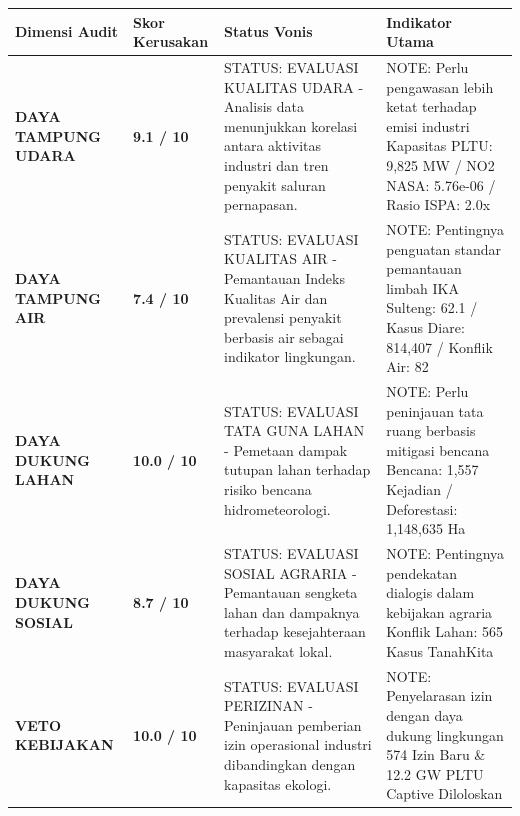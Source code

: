 \documentclass[
]{article}
\newcounter{none} %
\begin{document}
{\def\LTcaptype{none} %
\begin{longtable}[]{@{}
  >{\raggedright\arraybackslash}p{}
  >{\raggedright\arraybackslash}p{}
  >{\raggedright\arraybackslash}p{}
  >{\raggedright\arraybackslash}p{}@{}}
\toprule\noalign{}
\begin{minipage}[b]{\linewidth}\raggedright
Dimensi Audit
\end{minipage} & \begin{minipage}[b]{\linewidth}\raggedright
Skor Kerusakan
\end{minipage} & \begin{minipage}[b]{\linewidth}\raggedright
Status Vonis
\end{minipage} & \begin{minipage}[b]{\linewidth}\raggedright
Indikator Utama
\end{minipage} \\
\midrule\noalign{}
\endhead
\bottomrule\noalign{}
\endlastfoot
\textbf{DAYA TAMPUNG UDARA} & \textbf{9.1 / 10} & STATUS: EVALUASI
KUALITAS UDARA - Analisis data menunjukkan korelasi antara aktivitas
industri dan tren penyakit saluran pernapasan. & NOTE: Perlu pengawasan
lebih ketat terhadap emisi industri \textbar{} Kapasitas PLTU: 9,825 MW
/ NO2 NASA: 5.76e-06 / Rasio ISPA: 2.0x \\
\textbf{DAYA TAMPUNG AIR} & \textbf{7.4 / 10} & STATUS: EVALUASI
KUALITAS AIR - Pemantauan Indeks Kualitas Air dan prevalensi penyakit
berbasis air sebagai indikator lingkungan. & NOTE: Pentingnya penguatan
standar pemantauan limbah \textbar{} IKA Sulteng: 62.1 / Kasus Diare:
814,407 / Konflik Air: 82 \\
\textbf{DAYA DUKUNG LAHAN} & \textbf{10.0 / 10} & STATUS: EVALUASI TATA
GUNA LAHAN - Pemetaan dampak tutupan lahan terhadap risiko bencana
hidrometeorologi. & NOTE: Perlu peninjauan tata ruang berbasis mitigasi
bencana \textbar{} Bencana: 1,557 Kejadian / Deforestasi: 1,148,635
Ha \\
\textbf{DAYA DUKUNG SOSIAL} & \textbf{8.7 / 10} & STATUS: EVALUASI
SOSIAL AGRARIA - Pemantauan sengketa lahan dan dampaknya terhadap
kesejahteraan masyarakat lokal. & NOTE: Pentingnya pendekatan dialogis
dalam kebijakan agraria \textbar{} Konflik Lahan: 565 Kasus TanahKita \\
\textbf{VETO KEBIJAKAN} & \textbf{10.0 / 10} & STATUS: EVALUASI
PERIZINAN - Peninjauan pemberian izin operasional industri dibandingkan
dengan kapasitas ekologi. & NOTE: Penyelarasan izin dengan daya dukung
lingkungan \textbar{} 574 Izin Baru \& 12.2 GW PLTU Captive
Diloloskan \\
\end{longtable}
}
\end{document}

